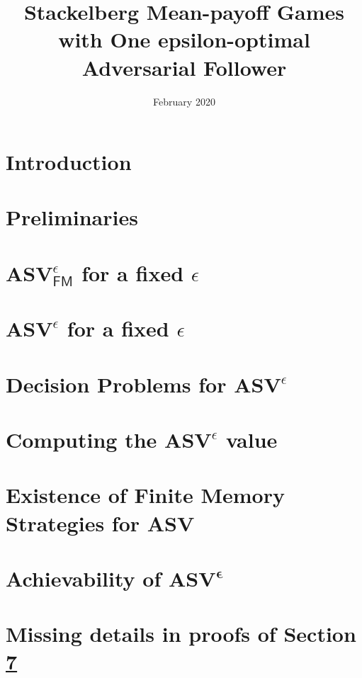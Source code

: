 \documentclass{article}
\title{\textbf{Stackelberg Mean-payoff Games with One epsilon-optimal Adversarial Follower}}
\author{}
\date{February 2020}
\begin{document}
\maketitle


\section{Introduction} 
  \label{sec:intro}
  

\section{Preliminaries}
  \label{sec:prelim}
  

\section{$\mathbf{ASV}^{\epsilon}_{\mathsf{FM}}$ for a fixed $\epsilon$}
  \label{sec:FMStrategy}
  

\section{$\mathbf{ASV}^{\epsilon}$ for a fixed $\epsilon$}
  

\section{Decision Problems for $\mathbf{ASV}^{\epsilon}$}
  

\section{Computing the $\mathbf{ASV}^{\epsilon}$ value}
  

\section{Existence of Finite Memory Strategies for ASV}
  \label{sec:FMASV}
  

\section{Achievability of $\mathbf{ASV^{\epsilon}}$}
  



\appendix
\pagebreak
\section{Missing details in proofs of Section \ref{sec:FMASV}}

\end{document}
